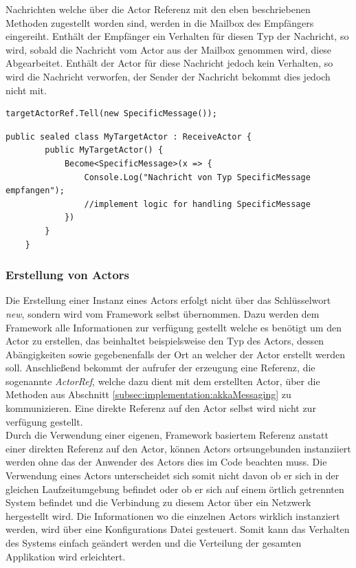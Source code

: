 Nachrichten welche über die Actor Referenz mit den eben beschriebenen Methoden zugestellt worden sind, werden in die Mailbox des Empfängers eingereiht. Enthält der Empfänger ein Verhalten für diesen Typ der Nachricht, so wird, sobald die Nachricht vom Actor aus der Mailbox genommen wird, diese Abgearbeitet. Enthält der Actor für diese Nachricht jedoch kein Verhalten, so wird die Nachricht verworfen, der Sender der Nachricht bekommt dies jedoch nicht mit. 

\begin{lstlisting}[caption=Versenden einer Nachricht an einen anderen Actor, label=code:actor:TellMethod]
    targetActorRef.Tell(new SpecificMessage());
\end{lstlisting}

\begin{lstlisting}[caption=Hier wird für den Actor \textit{MyTargetActor} das Verhalten für eine Einkommende Nachricht vom Typ \textit{SpecificMessage} festgellegt., label=lst:test]
    public sealed class MyTargetActor : ReceiveActor {
        public MyTargetActor() {
            Become<SpecificMessage>(x => {
                Console.Log("Nachricht von Typ SpecificMessage empfangen");
                //implement logic for handling SpecificMessage
            })
        }
    }    
\end{lstlisting}

\subsubsection{Erstellung von Actors}
\label{subsec:implementation:actorCreation}
Die Erstellung einer Instanz eines Actors erfolgt nicht über das Schlüsselwort \textit{new}, sondern wird vom Framework selbst übernommen. Dazu werden dem Framework alle Informationen zur verfügung gestellt welche es benötigt um den Actor zu erstellen, das beinhaltet beispielsweise den Typ des Actors, dessen Abängigkeiten sowie gegebenenfalls der Ort an welcher der Actor erstellt werden soll. Anschließend bekommt der aufrufer der erzeugung eine Referenz, die sogenannte \textit{ActorRef}, welche dazu dient mit dem erstellten Actor, über die Methoden aus Abschnitt \ref{subsec:implementation:akkaMessaging} zu kommunizieren. Eine direkte Referenz auf den Actor selbst wird nicht zur verfügung gestellt. \\
Durch die Verwendung einer eigenen, Framework basiertem Referenz anstatt einer direkten Referenz auf den Actor, können Actors ortsungebunden instanziiert werden ohne das der Anwender des Actors dies im Code beachten muss. Die Verwendung eines Actors unterscheidet sich somit nicht davon ob er sich in der gleichen Laufzeitumgebung befindet oder ob er sich auf einem örtlich getrennten System befindet und die Verbindung zu diesem Actor über ein Netzwerk hergestellt wird. Die Informationen wo die einzelnen Actors wirklich instanziert werden, wird über eine Konfigurations Datei gesteuert. Somit kann das Verhalten des Systems einfach geändert werden und die Verteilung der gesamten Applikation wird erleichtert.

